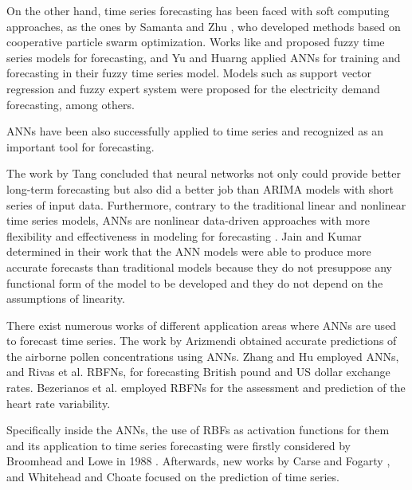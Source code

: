 \documentclass[preprint,authoryear,12pt]{elsarticle}
\begin{document}

On the other hand, time series forecasting has been faced with soft computing approaches, as the ones by Samanta \cite{Samanta2011} and Zhu \cite{Zhu2011}, who developed methods based on cooperative particle swarm optimization. Works like \cite{Qiu2011} and \cite{Wang2011} proposed fuzzy time series models for forecasting, and Yu and Huarng \cite{Yu2010} applied ANNs for training and forecasting in their fuzzy time series model. Models such as support vector regression \cite{Kavaklioglu2011} and fuzzy expert system \cite{Dash1995} were proposed for the electricity demand forecasting, among others.

ANNs have been also successfully applied to time series and recognized as an important tool for forecasting. 

The work by Tang \cite{Tang1991} concluded that neural networks not only could provide better long-term forecasting but also did a better job than ARIMA models with short series of input data. Furthermore, contrary to the traditional linear and nonlinear time series models, ANNs are nonlinear data-driven approaches with more flexibility and effectiveness in modeling for forecasting \cite{Zhang1998b}. Jain and Kumar determined in their work \cite{Jain2007} that the ANN models were able to produce more accurate forecasts than traditional models because they do not presuppose any functional form of the model to be developed and they do not depend on the assumptions of linearity.

There exist numerous works of different application areas where ANNs are used to forecast time series. The work by Arizmendi \cite{Arizmendi1993} obtained accurate predictions of the airborne pollen concentrations using ANNs. Zhang and Hu \cite{Zhang1998b} employed ANNs, and Rivas et al. \cite{Rivas04} RBFNs, for forecasting British pound and US dollar exchange rates. Bezerianos et al. \cite{Bezerianos1999} employed RBFNs for the assessment and prediction of the heart rate variability. 


Specifically inside the ANNs, the use of RBFs as activation functions for them and its application to time series forecasting were firstly considered by Broomhead and Lowe in 1988 \cite{Broomhead88}. Afterwards, new works by Carse and Fogarty \cite{Carse1996}, and Whitehead and Choate \cite{Whitehead96} focused on the prediction of time series.
\end{document}
